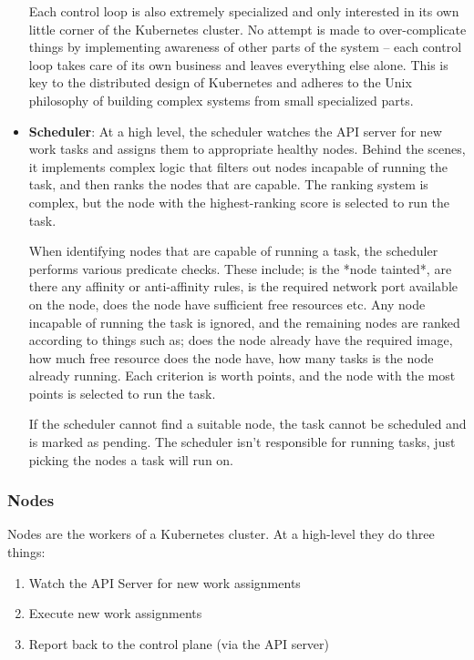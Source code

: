 \documentclass[10pt,a4paper]{report}
\begin{document}
\begin{itemize}
\begin{enumerate}
	\end{enumerate}
	
	Each control loop is also extremely specialized and only interested in its own little corner of the Kubernetes cluster. No attempt is made to over-complicate things by implementing awareness of other parts of the system – each control loop takes care of its own business and leaves everything else alone. This is key to the distributed design of Kubernetes and adheres to the Unix philosophy of building complex systems from small specialized parts.
	\item \textbf{Scheduler}: At a high level, the scheduler watches the API server for new work tasks and assigns them to appropriate healthy nodes. Behind the scenes, it implements complex logic that filters out nodes incapable of running the task, and then ranks the nodes that are capable. The ranking system is complex, but the node with the highest-ranking score is selected to run the task.
	
	When identifying nodes that are capable of running a task, the scheduler performs various predicate checks. These include; is the *node tainted*, are there any affinity or anti-affinity rules, is the required network port available on the node, does the node have sufficient free resources etc. Any node incapable of running the task is ignored, and the remaining nodes are ranked according to things such as; does the node already have the required image, how much free resource does the node have, how many tasks is the node already running. Each criterion is worth points, and the node with the most points is selected to run the task.
	
	If the scheduler cannot find a suitable node, the task cannot be scheduled and is marked as pending.
	The scheduler isn’t responsible for running tasks, just picking the nodes a task will run on.
\end{itemize}

\subsubsection{Nodes}
Nodes are the workers of a Kubernetes cluster. At a high-level they do three things:
\begin{enumerate}
	\item Watch the API Server for new work assignments
	\item Execute new work assignments
	\item Report back to the control plane (via the API server)
\end{enumerate}
\end{document}
